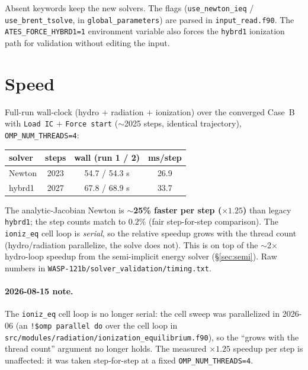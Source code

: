 \documentclass[english,a4paper]{my_memo}
\begin{document}
\noindent Absent keywords keep the new solvers. The flags
(\texttt{use\_newton\_ieq} / \texttt{use\_brent\_tsolve}, in
\texttt{global\_parameters}) are parsed in \texttt{input\_read.f90}. The
\texttt{ATES\_FORCE\_HYBRD1=1} environment variable also forces the \texttt{hybrd1}
ionization path for validation without editing the input.

\section{Speed}\label{sec:speed}
Full-run wall-clock (hydro $+$ radiation $+$ ionization) over the converged Case~B
with \texttt{Load IC} $+$ \texttt{Force start} ($\sim$2025 steps, identical
trajectory), \texttt{OMP\_NUM\_THREADS=4}:

\begin{center}\small
\begin{tabular}{@{}lccc@{}}
\toprule
solver & steps & wall (run 1 / 2) & ms/step \\
\midrule
Newton & 2023 & 54.7 / 54.3 s & 26.9 \\
hybrd1 & 2027 & 67.8 / 68.9 s & 33.7 \\
\bottomrule
\end{tabular}
\end{center}

\noindent The analytic-Jacobian Newton is \textbf{$\sim$25\% faster per step
($\times1.25$)} than legacy \texttt{hybrd1}; the step counts match to $0.2\%$
(fair step-for-step comparison). The \texttt{ioniz\_eq} cell loop is \emph{serial}, so
the relative speedup grows with the thread count (hydro/radiation parallelize, the
solve does not). This is on top of the $\sim$2$\times$ hydro-loop speedup from the
semi-implicit energy solver (\S\ref{sec:semi}). Raw numbers in
\texttt{WASP-121b/solver\_validation/timing.txt}.

\paragraph{2026-08-15 note.} The \texttt{ioniz\_eq} cell loop is no longer
serial: the cell sweep was parallelized in 2026-06 (an \verb|!$omp parallel do|
over the cell loop in
\texttt{src/modules/radiation/ionization\_equilibrium.f90}), so the ``grows with the thread
count'' argument no longer holds. The measured $\times1.25$ speedup per step is
unaffected: it was taken step-for-step at a fixed
\texttt{OMP\_NUM\_THREADS=4}.
\end{document}
